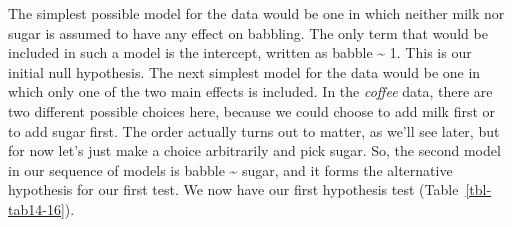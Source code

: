 \documentclass[
  a4paper,
]{book}
\begin{document}
The simplest possible model for the data would be one in which neither
milk nor sugar is assumed to have any effect on babbling. The only term
that would be included in such a model is the intercept, written as
babble \textasciitilde{} 1. This is our initial null hypothesis. The
next simplest model for the data would be one in which only one of the
two main effects is included. In the \emph{coffee} data, there are two
different possible choices here, because we could choose to add milk
first or to add sugar first. The order actually turns out to matter, as
we'll see later, but for now let's just make a choice arbitrarily and
pick sugar. So, the second model in our sequence of models is babble
\textasciitilde{} sugar, and it forms the alternative hypothesis for our
first test. We now have our first hypothesis test
(Table~\ref{tbl-tab14-16}).

\hypertarget{tbl-tab14-16}{}
 
  \providecommand{\huxb}[2]{\arrayrulecolor[RGB]{#1}\global\arrayrulewidth=#2pt}
  \providecommand{\huxvb}[2]{\color[RGB]{#1}\vrule width #2pt}
  \providecommand{\huxtpad}[1]{\rule{0pt}{#1}}
  \providecommand{\huxbpad}[1]{\rule[-#1]{0pt}{#1}}
\end{document}
